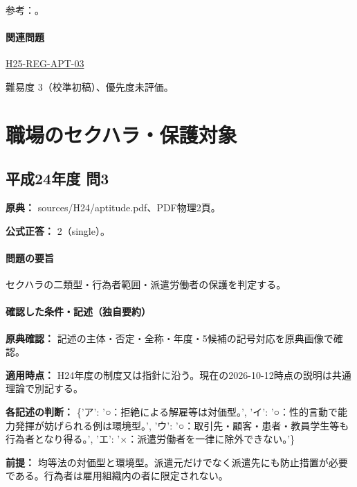 \par 参考：\cite{employment_power2012,employment_power_current}。

\paragraph{関連問題} \hyperref[q:h25-reg-apt-03]{H25-REG-APT-03}

\par 難易度 3（校準初稿）、優先度未評価。

\section{職場のセクハラ・保護対象}

\subsection{平成24年度 問3}
\label{q:h24-reg-apt-03}

\noindent\textbf{原典：} sources/H24/aptitude.pdf、PDF物理2頁。

\textbf{公式正答：} 2（single）。

\paragraph{問題の要旨} セクハラの二類型・行為者範囲・派遣労働者の保護を判定する。

\paragraph{確認した条件・記述（独自要約）}\mbox{}\par

\noindent\textbf{原典確認：} 記述の主体・否定・全称・年度・5候補の記号対応を原典画像で確認。\par

\noindent\textbf{適用時点：} H24年度の制度又は指針に沿う。現在の2026-10-12時点の説明は共通理論で別記する。\par

\noindent\textbf{各記述の判断：} \{'ア': '○：拒絶による解雇等は対価型。', 'イ': '○：性的言動で能力発揮が妨げられる例は環境型。', 'ウ': '○：取引先・顧客・患者・教員学生等も行為者となり得る。', 'エ': '×：派遣労働者を一律に除外できない。'\}\par

\noindent\textbf{前提：} 均等法の対価型と環境型。派遣元だけでなく派遣先にも防止措置が必要である。行為者は雇用組織内の者に限定されない。\par

